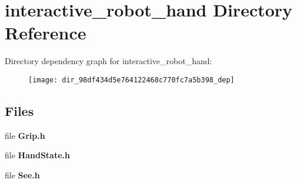 \section{interactive\-\_\-robot\-\_\-hand Directory Reference}
\label{dir_98df434d5e764122468c770fc7a5b398}
Directory dependency graph for interactive\-\_\-robot\-\_\-hand\-:\nopagebreak
\begin{figure}[H]
\begin{center}
\leavevmode
\texttt{[image: dir\_98df434d5e764122468c770fc7a5b398\_dep]}
\end{center}
\end{figure}
\subsection*{Files}
\begin{DoxyCompactItemize}
\item 
file {\bf Grip.\-h}
\item 
file {\bf Hand\-State.\-h}
\item 
file {\bf See.\-h}
\end{DoxyCompactItemize}
